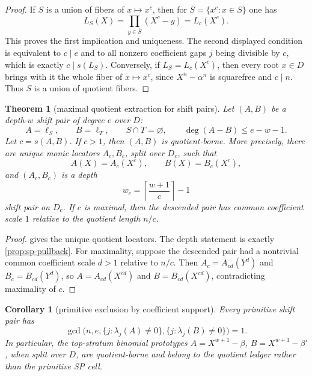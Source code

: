 \documentclass[a4paper,11pt]{amsart}
\newtheorem{theorem}{Theorem}[section]
\newtheorem{corollary}[corollary]{Corollary}
\theoremstyle{remark}
\begin{document}
\begin{proof}
If \(S\) is a union of fibers of \(x\mapsto x^c\), then for \(\overline S=\{x^c:x\in S\}\) one has
\[
        L_S(X)=\prod_{y\in\overline S}(X^c-y)=L_c(X^c).
\]
This proves the first implication and uniqueness.  The second displayed condition is equivalent to \(c\mid e\) and to all nonzero coefficient gaps \(j\) being divisible by \(c\), which is exactly \(c\mid s(L_S)\).  Conversely, if \(L_S=L_c(X^c)\), then every root \(x\in D\) brings with it the whole fiber of \(x\mapsto x^c\), since \(X^n-\alpha^n\) is squarefree and \(c\mid n\).  Thus \(S\) is a union of quotient fibers.
\end{proof}

\begin{theorem}[maximal quotient extraction for shift pairs]\label{thm:coeff-quotient-extract}
Let \((A,B)\) be a depth-\(w\) shift pair of degree \(e\) over \(D\):
\[
        A=\ell_S,\qquad B=\ell_T,\qquad S\cap T=\varnothing,\qquad
        \deg(A-B)\le e-w-1.
\]
Let \(c=s(A,B)\).  If \(c>1\), then \((A,B)\) is quotient-borne.  More precisely, there are unique monic locators \(A_c,B_c\), split over \(D_c\), such that
\[
        A(X)=A_c(X^c),\qquad B(X)=B_c(X^c),
\]
and \((A_c,B_c)\) is a depth
\[
        w_c=\left\lceil\frac{w+1}{c}\right\rceil-1
\]
shift pair on \(D_c\).  If \(c\) is maximal, then the descended pair has common coefficient scale \(1\) relative to the quotient length \(n/c\).
\end{theorem}

\begin{proof}
 gives the unique quotient locators.  The depth statement is exactly \cref{prop:sp-pullback}.  For maximality, suppose the descended pair had a nontrivial common coefficient scale \(d>1\) relative to \(n/c\).  Then \(A_c=A_{cd}(Y^d)\) and \(B_c=B_{cd}(Y^d)\), so \(A=A_{cd}(X^{cd})\) and \(B=B_{cd}(X^{cd})\), contradicting maximality of \(c\).
\end{proof}

\begin{corollary}[primitive exclusion by coefficient support]\label{cor:primitive-coeff-exclusion}
Every primitive shift pair has
\[
        \gcd\bigl(n,e,\{j:\lambda_j(A)\ne0\},\{j:\lambda_j(B)\ne0\}\bigr)=1.
\]
In particular, the top-stratum binomial prototypes \(A=X^{w+1}-\beta\), \(B=X^{w+1}-\beta'\), when split over \(D\), are quotient-borne and belong to the quotient ledger rather than the primitive SP cell.
\end{corollary}
\end{document}
